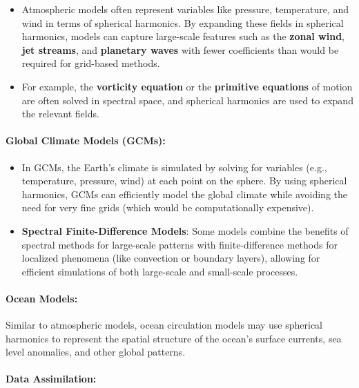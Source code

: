 \begin{itemize}
	\item Atmospheric models often represent variables like pressure, temperature, and wind in terms of spherical harmonics. By expanding these fields in spherical harmonics, models can capture large-scale features such as the \textbf{zonal wind}, \textbf{jet streams}, and \textbf{planetary waves} with fewer coefficients than would be required for grid-based methods.
	\item For example, the \textbf{vorticity equation} or the \textbf{primitive equations} of motion are often solved in spectral space, and spherical harmonics are used to expand the relevant fields.
\end{itemize}

\paragraph{\textbf{Global Climate Models (GCMs)}:}

\begin{itemize}
	\item In GCMs, the Earth's climate is simulated by solving for variables (e.g., temperature, pressure, wind) at each point on the sphere. By using spherical harmonics, GCMs can efficiently model the global climate while avoiding the need for very fine grids (which would be computationally expensive).
	\item \textbf{Spectral Finite-Difference Models}: Some models combine the benefits of spectral methods for large-scale patterns with finite-difference methods for localized phenomena (like convection or boundary layers), allowing for efficient simulations of both large-scale and small-scale processes.
\end{itemize}

\paragraph{\textbf{Ocean Models}:}

Similar to atmospheric models, ocean circulation models may use spherical harmonics to represent the spatial structure of the ocean's surface currents, sea level anomalies, and other global patterns.

\paragraph{\textbf{Data Assimilation}:}

